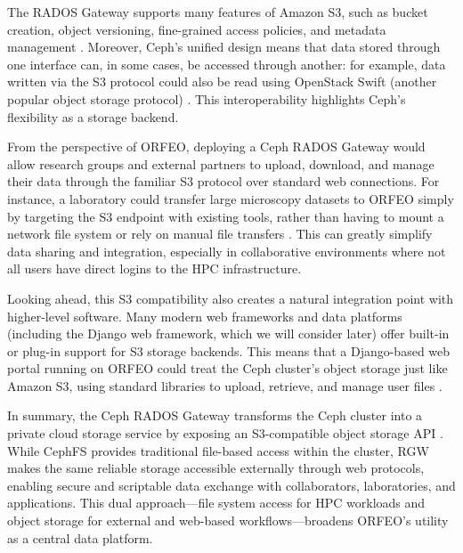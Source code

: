 The RADOS Gateway supports many features of Amazon S3, such as bucket creation, 
object versioning, fine-grained access policies, and metadata 
management \parencite{Ceph_RGW_S3}. Moreover, Ceph’s unified design means that 
data stored through one interface can, in some cases, be accessed through 
another: for example, data written via the S3 protocol could also be read using 
OpenStack Swift (another popular object storage 
protocol) \parencite{Ceph_RGW_Overview}. This interoperability highlights Ceph’s 
flexibility as a storage backend.

\medskip

From the perspective of ORFEO, deploying a Ceph RADOS Gateway would allow 
research groups and external partners to upload, download, and manage their data 
through the familiar S3 protocol over standard web connections. For instance, a 
laboratory could transfer large microscopy datasets to ORFEO simply by 
targeting the S3 endpoint with existing tools, rather than having to mount a 
network file system or rely on manual file 
transfers \parencite{Ceph_RGW_S3}. This can greatly simplify data sharing and 
integration, especially in collaborative environments where not all users have 
direct logins to the HPC infrastructure.

\medskip

Looking ahead, this S3 compatibility also creates a natural integration point 
with higher-level software. Many modern web frameworks and data platforms 
(including the Django web framework, which we will consider later) offer 
built-in or plug-in support for S3 storage backends. This means that a 
Django-based web portal running on ORFEO could treat the Ceph cluster’s object 
storage just like Amazon S3, using standard libraries to upload, retrieve, and 
manage user files \parencite{Ceph_RGW_S3,Ceph_RGW_Overview}.

\medskip

In summary, the Ceph RADOS Gateway transforms the Ceph cluster into a private 
cloud storage service by exposing an S3-compatible object storage 
API \parencite{Ceph_RGW_S3,Ceph_RGW_Overview}. While CephFS provides traditional 
file-based access within the cluster, RGW makes the same reliable storage 
accessible externally through web protocols, enabling secure and scriptable data 
exchange with collaborators, laboratories, and applications. This dual 
approach—file system access for HPC workloads and object storage for external 
and web-based workflows—broadens ORFEO’s utility as a central data platform.


